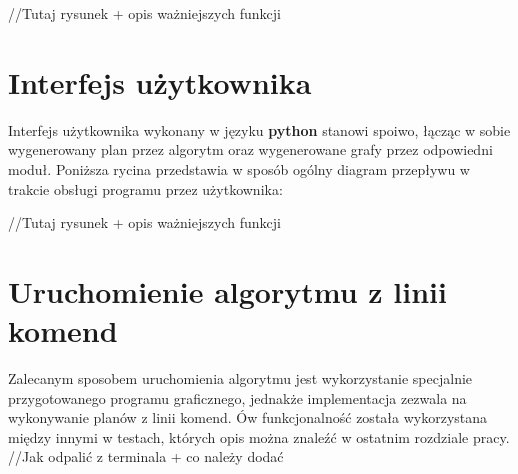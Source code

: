     //Tutaj rysunek + opis ważniejszych funkcji

\section{Interfejs użytkownika}
    Interfejs użytkownika wykonany w języku \textbf{python} stanowi spoiwo, łącząc w sobie wygenerowany plan przez algorytm oraz wygenerowane grafy przez 
    odpowiedni moduł. Poniższa rycina przedstawia w sposób ogólny diagram przepływu w trakcie obsługi programu przez użytkownika:

    //Tutaj rysunek + opis ważniejszych funkcji


\section{Uruchomienie algorytmu z linii komend}
    \label{CommandLine}
    Zalecanym sposobem uruchomienia algorytmu jest wykorzystanie specjalnie przygotowanego programu graficznego, jednakże implementacja zezwala na 
    wykonywanie planów z linii komend. Ów funkcjonalność została wykorzystana między innymi w testach, których opis można znaleźć w ostatnim rozdziale pracy.
    //Jak odpalić z terminala + co należy dodać

